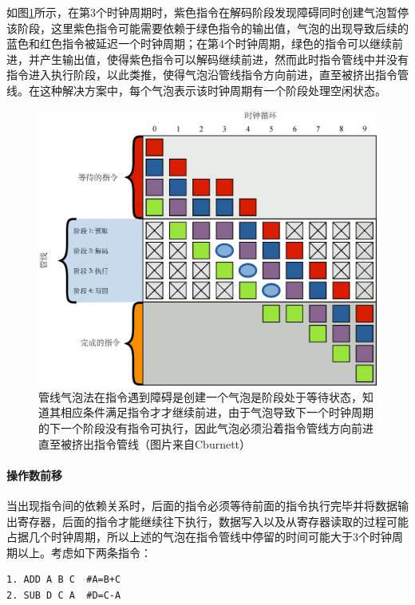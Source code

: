 如图\ref{f:rp-pipeline-bubble}所示，在第3个时钟周期时，紫色指令在解码阶段发现障碍同时创建气泡暂停该阶段，这里紫色指令可能需要依赖于绿色指令的输出值，气泡的出现导致后续的蓝色和红色指令被延迟一个时钟周期；在第4个时钟周期，绿色的指令可以继续前进，并产生输出值，使得紫色指令可以解码继续前进，然而此时指令管线中并没有指令进入执行阶段，以此类推，使得气泡沿管线指令方向前进，直至被挤出指令管线。在这种解决方案中，每个气泡表示该时钟周期有一个阶段处理空闲状态。

\begin{figure}
	\includegraphics[width=\textwidth]{figures/rp/Pipeline-bubble}
	\caption{管线气泡法在指令遇到障碍是创建一个气泡是阶段处于等待状态，知道其相应条件满足指令才才继续前进，由于气泡导致下一个时钟周期的下一个阶段没有指令可执行，因此气泡必须沿着指令管线方向前进直至被挤出指令管线（图片来自Cburnett）}
	\label{f:rp-pipeline-bubble}
\end{figure}




\paragraph{操作数前移}
当出现指令间的依赖关系时，后面的指令必须等待前面的指令执行完毕并将数据输出寄存器，后面的指令才能继续往下执行，数据写入以及从寄存器读取的过程可能占据几个时钟周期，所以上述的气泡在指令管线中停留的时间可能大于3个时钟周期以上。考虑如下两条指令：

\begin{lstlisting}
1. ADD A B C  #A=B+C
2. SUB D C A  #D=C-A
\end{lstlisting}

